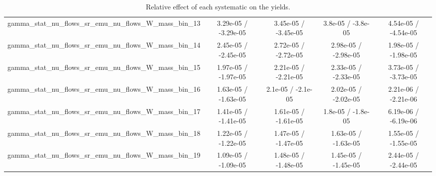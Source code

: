 \documentclass[10pt]{article}
\begin{document}
\begin{table}[htbp]
\begin{center}
\begin{tabular}{|c|c|c|c|c|}
  gamma_stat_nu_flows_sr_emu_nu_flows_W_mass_bin_13 & 3.29e-05 / -3.29e-05 & 3.45e-05 / -3.45e-05 & 3.8e-05 / -3.8e-05 & 4.54e-05 / -4.54e-05 \\ 
  gamma_stat_nu_flows_sr_emu_nu_flows_W_mass_bin_14 & 2.45e-05 / -2.45e-05 & 2.72e-05 / -2.72e-05 & 2.98e-05 / -2.98e-05 & 1.98e-05 / -1.98e-05 \\ 
  gamma_stat_nu_flows_sr_emu_nu_flows_W_mass_bin_15 & 1.97e-05 / -1.97e-05 & 2.21e-05 / -2.21e-05 & 2.33e-05 / -2.33e-05 & 3.73e-05 / -3.73e-05 \\ 
  gamma_stat_nu_flows_sr_emu_nu_flows_W_mass_bin_16 & 1.63e-05 / -1.63e-05 & 2.1e-05 / -2.1e-05 & 2.02e-05 / -2.02e-05 & 2.21e-06 / -2.21e-06 \\ 
  gamma_stat_nu_flows_sr_emu_nu_flows_W_mass_bin_17 & 1.41e-05 / -1.41e-05 & 1.61e-05 / -1.61e-05 & 1.8e-05 / -1.8e-05 & 6.19e-06 / -6.19e-06 \\ 
  gamma_stat_nu_flows_sr_emu_nu_flows_W_mass_bin_18 & 1.22e-05 / -1.22e-05 & 1.47e-05 / -1.47e-05 & 1.63e-05 / -1.63e-05 & 1.55e-05 / -1.55e-05 \\ 
  gamma_stat_nu_flows_sr_emu_nu_flows_W_mass_bin_19 & 1.09e-05 / -1.09e-05 & 1.48e-05 / -1.48e-05 & 1.45e-05 / -1.45e-05 & 2.44e-05 / -2.44e-05 \\ 
\hline 
\end{tabular} 
\caption{Relative effect of each systematic on the yields.} 
\end{center} 
\end{table} 
\end{document}
